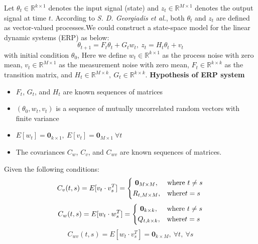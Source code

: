 \documentclass[a4 paper]{article}
\begin{document}
\begin{tcolorbox}[colback=RoyalBlue!5!white,colframe=RoyalBlue!75!black,title=Model Formalization]
\par Let $\theta_t\in\mathbb{R}^{k\times1}$ denotes the input signal (state) and $z_t\in\mathbb{R}^{M\times1}$ denotes the output signal at time $t$. According to \textit{S. D.  Georgiadis et al.}, both $\theta_t$ and $z_t$ are defined as vector-valued processes.We could construct a state-space model for the linear dynamic systems (ERP) as below: 
\begin{equation}
    \theta_{t+1}=F_t\theta_t+G_tw_t, \ z_t=H_t\theta_t+v_t
\end{equation}
with initial condition $\theta_0$, Here we define $w_t\in\mathbb{R}^{k\times1}$ as the process noise with zero mean, $v_t\in\mathbb{R}^{M\times1}$ as the measurement noise with zero mean,  $F_t\in\mathbb{R}^{k\times k}$ as the transition matrix, and $H_t\in\mathbb{R}^{M\times k}, \ G_t\in\mathbb{R}^{k\times k}$.
\tcblower
\textbf{Hypothesis of ERP system}
\begin{itemize}
    \item $F_t$, $G_t$, and $H_t$ are known sequences of matrices
    \item $(\theta_0,w_t,v_t)$ is a sequence of mutually uncorrelated random vectors with finite variance
    \item $E[w_t]=\textbf{0}_{k\times1}, \ E[v_t]=\textbf{0}_{M\times1} \ \forall t$
    \item The covariances $C_w$, $C_v$, and $C_{wv}$ are known sequences of matrices.
\end{itemize}
Given the following conditions:
\begin{equation}
    C_v(t,s)=E[v_t\cdot v_s^T]= 
    \begin{dcases}
        \ \textbf{0}_{M\times M},& \text{where } t\neq s\\
        R_{t,M\times M},& \text{where} t=s
    \end{dcases}
\end{equation}
\begin{equation}
    C_w(t,s)=E[w_t\cdot w_s^T]= 
    \begin{dcases}
        \ \textbf{0}_{k\times k},& \text{where } t\neq s\\
        Q_{t,k\times k},& \text{where} t=s
    \end{dcases}
\end{equation}
\begin{equation}
    C_{wv}(t,s)=E[w_t\cdot v_s^T]=\textbf{0}_{k\times M}, \ \forall t, \ \forall s
\end{equation}
\end{tcolorbox}
\end{document}

